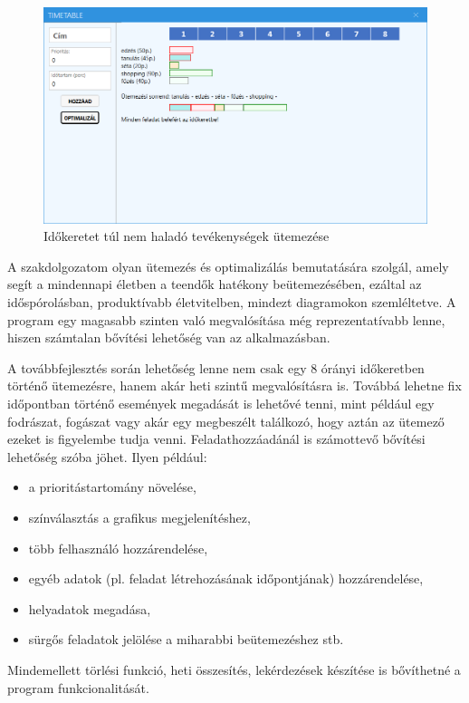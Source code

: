 \begin{figure}[h]
	\centering
	\includegraphics[scale=0.6]{images/test/result2.png}
	\caption{Időkeretet túl nem haladó tevékenységek ütemezése}
\end{figure}


A szakdolgozatom olyan ütemezés és optimalizálás bemutatására szolgál, amely segít a mindennapi életben a teendők hatékony beütemezésében, ezáltal az időspórolásban, produktívabb életvitelben, mindezt diagramokon szemléltetve. A program egy magasabb szinten való megvalósítása még reprezentatívabb lenne, hiszen számtalan bővítési lehetőség van az alkalmazásban.

A továbbfejlesztés során lehetőség lenne nem csak egy 8 órányi időkeretben történő ütemezésre, hanem akár heti szintű megvalósításra is. Továbbá lehetne fix időpontban történő események megadását is lehetővé tenni, mint például egy fodrászat, fogászat vagy akár egy megbeszélt találkozó, hogy aztán az ütemező ezeket is figyelembe tudja venni.
Feladathozzáadánál is számottevő bővítési lehetőség szóba jöhet. Ilyen például:
\begin{itemize}
\item a prioritástartomány növelése,
\item színválasztás a grafikus megjelenítéshez,
\item több felhasználó hozzárendelése,
\item egyéb adatok (pl. feladat létrehozásának időpontjának) hozzárendelése,
\item helyadatok megadása,
\item sürgős feladatok jelölése a miharabbi beütemezéshez stb.
\end{itemize}

Mindemellett törlési funkció, heti összesítés, lekérdezések készítése is bővíthetné a program funkcionalitását.

